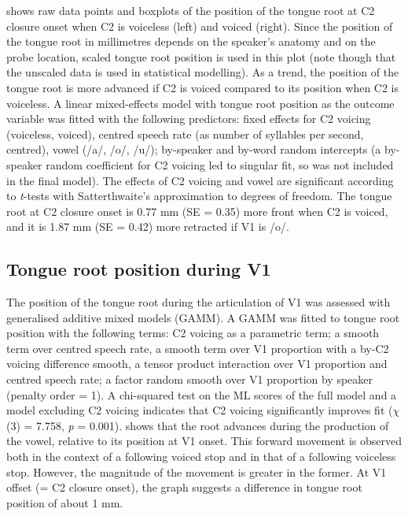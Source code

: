\documentclass[12pt,]{article}
\begin{document}
 shows raw data points and boxplots of the position of
the tongue root at C2 closure onset when C2 is voiceless (left) and
voiced (right). Since the position of the tongue root in millimetres
depends on the speaker's anatomy and on the probe location, scaled
tongue root position is used in this plot (note though that the unscaled
data is used in statistical modelling). As a trend, the position of the
tongue root is more advanced if C2 is voiced compared to its position
when C2 is voiceless. A linear mixed-effects model with tongue root
position as the outcome variable was fitted with the following
predictors: fixed effects for C2 voicing (voiceless, voiced), centred
speech rate (as number of syllables per second, centred), vowel (/a/,
/o/, /u/); by-speaker and by-word random intercepts (a by-speaker random
coefficient for C2 voicing led to singular fit, so was not included in
the final model). The effects of C2 voicing and vowel are significant
according to \emph{t}-tests with Satterthwaite's approximation to
degrees of freedom. The tongue root at C2 closure onset is 0.77 mm (SE =
0.35) more front when C2 is voiced, and it is 1.87 mm (SE = 0.42) more
retracted if V1 is /o/.

\hypertarget{tongue-root-position-during-v1}{%
\subsection{Tongue root position during
V1}\label{tongue-root-position-during-v1}}

\label{s:trp-v1}

The position of the tongue root during the articulation of V1 was
assessed with generalised additive mixed models (GAMM). A GAMM was
fitted to tongue root position with the following terms: C2 voicing as a
parametric term; a smooth term over centred speech rate, a smooth term
over V1 proportion with a by-C2 voicing difference smooth, a tensor
product interaction over V1 proportion and centred speech rate; a factor
random smooth over V1 proportion by speaker (penalty order = 1). A
chi-squared test on the ML scores of the full model and a model
excluding C2 voicing indicates that C2 voicing significantly improves
fit (\(\chi\)(3) = 7.758, \emph{p} = 0.001).  shows
that the root advances during the production of the vowel, relative to
its position at V1 onset. This forward movement is observed both in the
context of a following voiced stop and in that of a following voiceless
stop. However, the magnitude of the movement is greater in the former.
At V1 offset (= C2 closure onset), the graph suggests a difference in
tongue root position of about 1 mm.
\end{document}
